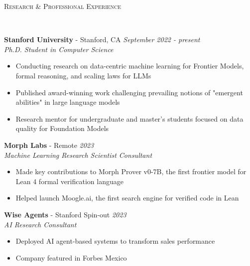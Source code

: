 \documentclass{article}
\newenvironment{changemargin}[2]{%
  \begin{list}{}{%
    \setlength{\topsep}{0pt}%
    \setlength{\leftmargin}{#1}%
    \setlength{\rightmargin}{#2}%
    \setlength{\listparindent}{\parindent}%
    \setlength{\itemindent}{\parindent}%
    \setlength{\parsep}{\parskip}%
  }%
  \item[]}{\end{list}
}
\newcommand{\lineover}{
	\begin{changemargin}{-0.05in}{-0.05in}
		\vspace*{-8pt}
		\hrulefill \\
		\vspace*{-2pt}
	\end{changemargin}
}
\newcommand{\header}[1]{
	\begin{changemargin}{-0.5in}{-0.5in}
		\scshape{#1}\\
  	\lineover
	\end{changemargin}
}
\newenvironment{body} {
	\vspace*{-16pt}
	\begin{changemargin}{-0.25in}{-0.5in}
  }	
	{\end{changemargin}
}
\begin{document}
\newpage

\header{Research \& Professional Experience}

\begin{body}
	\vspace{16pt}
 
    \textbf{Stanford University} - Stanford, CA \hfill \emph{September 2022 - present}\\
	\emph{Ph.D. Student in Computer Science}\\
	\vspace*{-3pt}
	\begin{itemize} \itemsep -2pt  %
		\item Conducting research on data-centric machine learning for Frontier Models, formal reasoning, and scaling laws for LLMs
		\item Published award-winning work challenging prevailing notions of "emergent abilities" in large language models
		\item Research mentor for undergraduate and master's students focused on data quality for Foundation Models
	\end{itemize}
	\vspace{5 pt}

    \textbf{Morph Labs} - Remote \hfill \emph{2023}\\
	\emph{Machine Learning Research Scientist Consultant}\\
	\vspace*{-3pt}
	\begin{itemize} \itemsep -2pt
		\item Made key contributions to Morph Prover v0-7B, the first frontier model for Lean 4 formal verification language
		\item Helped launch Moogle.ai, the first search engine for verified code in Lean
	\end{itemize}
	\vspace{5 pt}
	
	\textbf{Wise Agents} - Stanford Spin-out \hfill \emph{2023}\\
	\emph{AI Research Consultant}\\
	\vspace*{-3pt}
	\begin{itemize} \itemsep -2pt
		\item Deployed AI agent-based systems to transform sales performance
		\item Company featured in Forbes Mexico
	\end{itemize}
	\vspace{5 pt}


\end{body}
\end{document}

